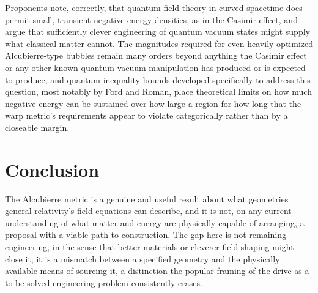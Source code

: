 \documentclass[11pt]{article}
\begin{document}
Proponents note, correctly, that quantum field theory in curved spacetime does permit small, transient negative energy densities, as in the Casimir effect, and argue that sufficiently clever engineering of quantum vacuum states might supply what classical matter cannot. The magnitudes required for even heavily optimized Alcubierre-type bubbles remain many orders beyond anything the Casimir effect or any other known quantum vacuum manipulation has produced or is expected to produce, and quantum inequality bounds developed specifically to address this question, most notably by Ford and Roman, place theoretical limits on how much negative energy can be sustained over how large a region for how long that the warp metric's requirements appear to violate categorically rather than by a closeable margin.

\section{Conclusion}

The Alcubierre metric is a genuine and useful result about what geometries general relativity's field equations can describe, and it is not, on any current understanding of what matter and energy are physically capable of arranging, a proposal with a viable path to construction. The gap here is not remaining engineering, in the sense that better materials or cleverer field shaping might close it; it is a mismatch between a specified geometry and the physically available means of sourcing it, a distinction the popular framing of the drive as a to-be-solved engineering problem consistently erases.
\end{document}
